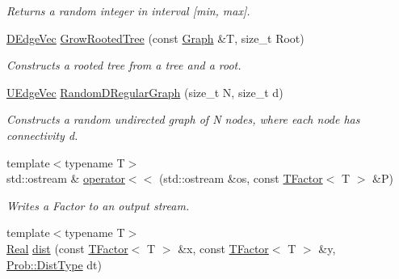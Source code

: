\begin{CompactItemize}
\begin{CompactList}\small\item\em Returns a random integer in interval \mbox{[}min, max\mbox{]}. \item\end{CompactList}\item 
\hypertarget{namespacedai_602bda76af8301b981bc9147793d72e0}{
\hyperlink{namespacedai_e7764251ab4d4b2d4fbec214eac83079}{DEdgeVec} \hyperlink{namespacedai_602bda76af8301b981bc9147793d72e0}{GrowRootedTree} (const \hyperlink{namespacedai_dfcfd53771d59db79ddd826928e76400}{Graph} \&T, size\_\-t Root)}
\label{namespacedai_602bda76af8301b981bc9147793d72e0}

\begin{CompactList}\small\item\em Constructs a rooted tree from a tree and a root. \item\end{CompactList}\item 
\hypertarget{namespacedai_7e19e088006a5e91e0d34d26cf6f3a8d}{
\hyperlink{namespacedai_ee930c2594ad57112ff5e230c4ca3391}{UEdgeVec} \hyperlink{namespacedai_7e19e088006a5e91e0d34d26cf6f3a8d}{RandomDRegularGraph} (size\_\-t N, size\_\-t d)}
\label{namespacedai_7e19e088006a5e91e0d34d26cf6f3a8d}

\begin{CompactList}\small\item\em Constructs a random undirected graph of N nodes, where each node has connectivity d. \item\end{CompactList}\item 
\hypertarget{namespacedai_dbcd0bf0cd16bda03f4483530611dbae}{
{\footnotesize template$<$typename T$>$ }\\std::ostream \& \hyperlink{namespacedai_dbcd0bf0cd16bda03f4483530611dbae}{operator$<$$<$} (std::ostream \&os, const \hyperlink{classdai_1_1TFactor}{TFactor}$<$ T $>$ \&P)}
\label{namespacedai_dbcd0bf0cd16bda03f4483530611dbae}

\begin{CompactList}\small\item\em Writes a Factor to an output stream. \item\end{CompactList}\item 
\hypertarget{namespacedai_21104476f853192821ff6685732ac0af}{
{\footnotesize template$<$typename T$>$ }\\\hyperlink{namespacedai_e7d0472fdc89a8635825d01940e91cbf}{Real} \hyperlink{namespacedai_21104476f853192821ff6685732ac0af}{dist} (const \hyperlink{classdai_1_1TFactor}{TFactor}$<$ T $>$ \&x, const \hyperlink{classdai_1_1TFactor}{TFactor}$<$ T $>$ \&y, \hyperlink{classdai_1_1TProb_492487fd71f6e87673853e5e2fda2f27}{Prob::DistType} dt)}
\label{namespacedai_21104476f853192821ff6685732ac0af}


\end{CompactItemize}
